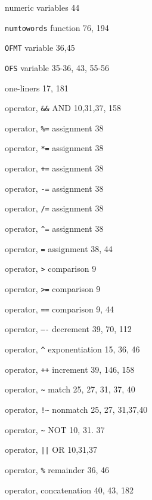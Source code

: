 \begin{multicols}{3}
\hangindent=3pc  numeric variables 44

\hangindent=3pc  \verb'numtowords' function 76, 194

\hangindent=3pc  \verb'OFMT' variable 36,45

\hangindent=3pc  \verb'OFS' variable 35-36, 43, 55-56

\hangindent=3pc  one-liners 17, 181

\hangindent=3pc  operator, \verb'&&' AND 10,31,37, 158

\hangindent=3pc  operator, \verb'%=' assignment 38

\hangindent=3pc  operator, \verb'*=' assignment 38

\hangindent=3pc  operator, \verb'+=' assignment 38

\hangindent=3pc  operator, \verb'-=' assignment 38

\hangindent=3pc  operator, \verb'/=' assignment 38

\hangindent=3pc  operator, \verb'^=' assignment 38

\hangindent=3pc  operator, \verb'=' assignment 38, 44

\hangindent=3pc  operator, \verb'>' comparison 9

\hangindent=3pc  operator, \verb'>=' comparison 9

\hangindent=3pc  operator, \verb'==' comparison 9, 44

\hangindent=3pc  operator, \verb'—-' decrement 39, 70, 112

\hangindent=3pc  operator, \verb'^' exponentiation 15, 36, 46

\hangindent=3pc  operator, \verb'++' increment 39, 146, 158

\hangindent=3pc  operator, \verb'~' match 25, 27, 31, 37, 40

\hangindent=3pc  operator, \verb'!~' nonmatch 25, 27, 31,37,40

\hangindent=3pc  operator, \verb'~' NOT 10, 31. 37

\hangindent=3pc  operator, \verb'||' OR 10,31,37

\hangindent=3pc  operator, \verb'%' remainder 36, 46

\hangindent=3pc  operator, concatenation 40, 43,  182


\end{multicols}
